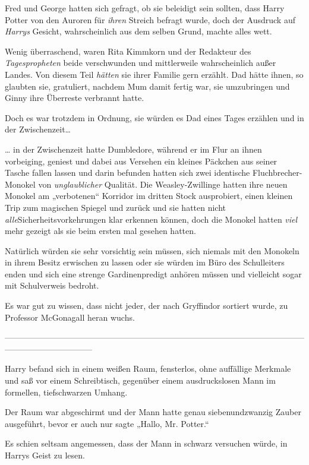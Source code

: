 {Fred und George hatten sich gefragt, ob sie beleidigt sein sollten, dass Harry Potter von den Auroren für \emph{ihren} Streich befragt wurde, doch der Ausdruck auf \emph{Harrys} Gesicht, wahrscheinlich aus dem selben Grund, machte alles wett.

Wenig überraschend, waren Rita Kimmkorn und der Redakteur des \emph{Tagespropheten} beide verschwunden und mittlerweile wahrscheinlich außer Landes. Von diesem Teil \emph{hätten} sie ihrer Familie gern erzählt. Dad hätte ihnen, so glaubten sie, gratuliert, nachdem Mum damit fertig war, sie umzubringen und Ginny ihre Überreste verbrannt hatte.

Doch es war trotzdem in Ordnung, sie würden es Dad eines Tages erzählen und in der Zwischenzeit…

… in der Zwischenzeit hatte Dumbledore, während er im Flur an ihnen vorbeiging, geniest und dabei aus Versehen ein kleines Päckchen aus seiner Tasche fallen lassen und darin befunden hatten sich zwei identische Fluchbrecher-Monokel von \emph{unglaublicher} Qualität. Die Weasley-Zwillinge hatten ihre neuen Monokel am „verbotenen“ Korridor im dritten Stock ausprobiert, einen kleinen Trip zum magischen Spiegel und zurück und sie hatten nicht \emph{alle}Sicherheitsvorkehrungen klar erkennen können, doch die Monokel hatten \emph{viel} mehr gezeigt als sie beim ersten mal gesehen hatten.

Natürlich würden sie sehr vorsichtig sein müssen, sich niemals mit den Monokeln in ihrem Besitz erwischen zu lassen oder sie würden im Büro des Schulleiters enden und sich eine strenge Gardinenpredigt anhören müssen und vielleicht sogar mit Schulverweis bedroht.

Es war gut zu wissen, dass nicht jeder, der nach Gryffindor sortiert wurde, zu Professor McGonagall heran wuchs.

--------------------------------------------------------------------------------------------------------------------------------------------

Harry befand sich in einem weißen Raum, fensterlos, ohne auffällige Merkmale und saß vor einem Schreibtisch, gegenüber einem ausdruckslosen Mann im formellen, tiefschwarzen Umhang.

Der Raum war abgeschirmt und der Mann hatte genau siebenundzwanzig Zauber ausgeführt, bevor er auch nur sagte „Hallo, Mr. Potter.“

Es schien seltsam angemessen, dass der Mann in schwarz versuchen würde, in Harrys Geist zu lesen.

}
